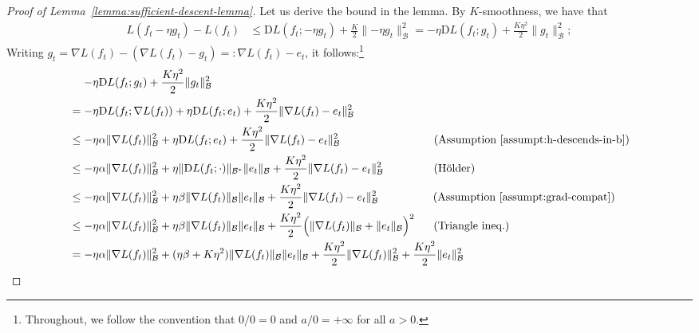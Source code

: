 \documentclass{article}
\newcommand{\B}{\mathcal{B}}
\newcommand{\D}{\mathrm{D}}
\begin{document}
\begin{proof}[Proof of Lemma~\ref{lemma:sufficient-descent-lemma}]
    Let us derive the bound in the lemma.
    By $K$-smoothness, we have that
    \begin{align*}
        L(f_t - \eta g_t) - L(f_t)
        &\leq \D L(f_t; -\eta g_t) + \frac{K}{2} \lVert -\eta g_t \rVert_{\B}^2
        = -\eta \D L(f_t; g_t) + \frac{K \eta^2}{2} \lVert g_t \rVert_{\B}^2;
    \end{align*}
    Writing $g_t = \nabla L(f_t) - (\nabla L(f_t) - g_t) =: \nabla L(f_t) - e_t$, it follows:\footnote{Throughout, we follow the convention that $0/0 = 0$ and $a/0 = +\infty$ for all $a>0$.}
    \begin{align*}
        &\mathrel{\phantom{=}} -\eta \D L(f_t; g_t) + \frac{K \eta^2}{2} \lVert g_t \rVert_{\B}^2
        \\ &= -\eta \D L(f_t; \nabla L(f_t)) + \eta \D L(f_t; e_t) + \frac{K \eta^2}{2} \lVert \nabla L(f_t) - e_t \rVert_{\B}^2
        \\ &\leq -\eta \alpha \lVert \nabla L(f_t) \rVert_\B^2 + \eta \D L(f_t; e_t) + \frac{K \eta^2}{2} \lVert \nabla L(f_t) - e_t \rVert_{\B}^2
            \hspace{8.4em} \text{(Assumption~\ref{assumpt:h-descends-in-b})}
        \\ &\leq -\eta \alpha \lVert \nabla L(f_t) \rVert_\B^2 + \eta \lVert \D L(f_t; \cdot) \rVert_{\B^*} \lVert e_t \rVert_\B + \frac{K \eta^2}{2} \lVert \nabla L(f_t) - e_t \rVert_{\B}^2
            \hspace{4.5em} \text{(Hölder)}
        \\ &\leq -\eta \alpha \lVert \nabla L(f_t) \rVert_\B^2 + \eta \beta \lVert \nabla L(f_t) \rVert_\B \lVert e_t \rVert_\B + \frac{K \eta^2}{2} \lVert \nabla L(f_t) - e_t \rVert_{\B}^2
            \hspace{4.9em} \text{(Assumption~\ref{assumpt:grad-compat})}
        \\ &\leq -\eta \alpha \lVert \nabla L(f_t) \rVert_\B^2 + \eta \beta \lVert \nabla L(f_t) \rVert_\B \lVert e_t \rVert_\B + \frac{K \eta^2}{2} \Bigl( \lVert \nabla L(f_t) \rVert_\B + \lVert e_t \rVert_\B \Bigr)^2
            \hspace{1.7em}  \text{(Triangle ineq.)}
        \\ &= -\eta \alpha \lVert \nabla L(f_t) \rVert_\B^2 + ( \eta \beta + K \eta^2 ) \lVert \nabla L(f_t) \rVert_\B \lVert e_t \rVert_\B + \frac{K \eta^2}{2} \lVert \nabla L(f_t) \rVert_\B^2 + \frac{K \eta^2}{2} \lVert e_t \rVert_\B^2

\end{align*}
\end{proof}
\end{document}
